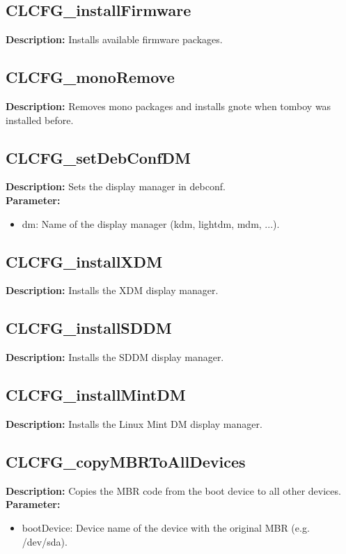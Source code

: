 \subsection{CLCFG\_installFirmware}
\textbf{Description:} Installs available firmware packages.\\

\subsection{CLCFG\_monoRemove}
\textbf{Description:} Removes mono packages and installs gnote when tomboy was installed before.\\

\subsection{CLCFG\_setDebConfDM}
\textbf{Description:} Sets the display manager in debconf.\\
\textbf{Parameter:}
\begin{itemize}
\item dm: Name of the display manager (kdm, lightdm, mdm, ...).
\end{itemize}

\subsection{CLCFG\_installXDM}
\textbf{Description:} Installs the XDM display manager.\\

\subsection{CLCFG\_installSDDM}
\textbf{Description:} Installs the SDDM display manager.\\

\subsection{CLCFG\_installMintDM}
\textbf{Description:} Installs the Linux Mint DM display manager.\\

\subsection{CLCFG\_copyMBRToAllDevices}
\textbf{Description:} Copies the MBR code from the boot device to all other devices.\\
\textbf{Parameter:}
\begin{itemize}
\item bootDevice: Device name of the device with the original MBR (e.g. /dev/sda).
\end{itemize}

